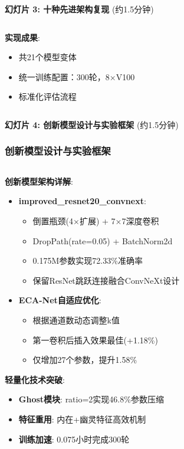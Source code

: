 \documentclass[10pt]{beamer}
\begin{document}
\begin{frame}{\textbf{幻灯片 3: 十种先进架构复现} (约1.5分钟)}
{\begin{columns}[T]
\begin{column}{0.5\textwidth}
        \vspace{0.1em}
        \textbf{实现成果}:
        \begin{itemize}
            \item 共21个模型变体
            \item 统一训练配置：300轮，8×V100
            \item 标准化评估流程
        \end{itemize}
    \end{column}
\end{columns}
}

\end{frame}

\begin{frame}{\textbf{幻灯片 4: 创新模型设计与实验框架} (约1.5分钟)}
\frametitle{创新模型设计与实验框架}

{\scriptsize
\begin{columns}[T]
    \begin{column}{0.48\textwidth}
        \textbf{创新模型架构详解}:
        \begin{itemize}
            \item \textbf{improved\_resnet20\_convnext}:
            \begin{itemize}
                \item 倒置瓶颈(4×扩展) + 7×7深度卷积
                \item DropPath(rate=0.05) + BatchNorm2d
                \item 0.175M参数实现72.33\%准确率
                \item 保留ResNet跳跃连接融合ConvNeXt设计
            \end{itemize}
            \item \textbf{ECA-Net自适应优化}:
            \begin{itemize}
                \item 根据通道数动态调整k值
                \item 第一卷积后插入效果最佳(+1.18\%)
                \item 仅增加27个参数，提升1.58\%
            \end{itemize}
        \end{itemize}
        
        \textbf{轻量化技术突破}:
        \begin{itemize}
            \item \textbf{Ghost模块}: ratio=2实现46.8\%参数压缩
            \item \textbf{特征重用}: 内在+幽灵特征高效机制
            \item \textbf{训练加速}: 0.075小时完成300轮
        \end{itemize}
        

\end{column}
\end{columns}}
\end{frame}
\end{document}
